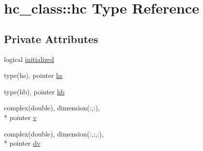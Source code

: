 \hypertarget{structhc__class_1_1hc}{\section{hc\-\_\-class\-:\-:hc Type Reference}
\label{structhc__class_1_1hc}
}
\subsection*{Private Attributes}
\begin{DoxyCompactItemize}
\item 
logical \hyperlink{structhc__class_1_1hc_a89151c80172cb67d68a44b6264afb8a7}{initialized}
\item 
type(hs), pointer \hyperlink{structhc__class_1_1hc_a09dd08ce79ada0e7a9f7c3eb8a2a50f5}{hs}
\item 
type(hb), pointer \hyperlink{structhc__class_1_1hc_a87af1d9489543e7f6a7501ea8468f763}{hb}
\item 
complex(double), dimension(\-:,\-:), \\*
pointer \hyperlink{structhc__class_1_1hc_ad3bab6b18bd729b4e1c49f7d14c0b4f9}{v}
\item 
complex(double), dimension(\-:,\-:,\-:), \\*
pointer \hyperlink{structhc__class_1_1hc_ae44fb8b1351b045650148c174099a1a1}{dv}
\end{DoxyCompactItemize}



